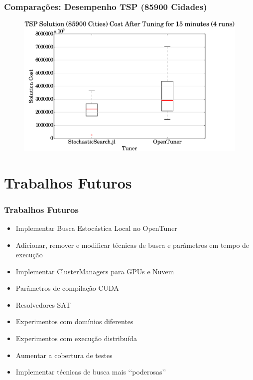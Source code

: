 \documentclass[10pt, compress]{beamer}
\begin{document}
\begin{frame}[fragile]
    \frametitle{Comparações: Desempenho TSP (85900 Cidades)}
    \begin{figure}[H]
        \centering
        \includegraphics[width=1\textwidth]{pla85900_15min_comparison}
    \end{figure}%
\end{frame}

\section{Trabalhos Futuros}

\begin{frame}[fragile]
    \frametitle{Trabalhos Futuros}
    \begin{itemize}
        \item Implementar Busca Estocástica Local no \alert{OpenTuner}
            \pause
        \item \alert{Adicionar}, \alert{remover} e \alert{modificar} técnicas
            de busca e parâmetros em \alert{tempo de execução}
            \pause
        \item Implementar \alert{ClusterManagers} para \alert{GPUs} e \alert{Nuvem}
            \pause
        \item Parâmetros de compilação \alert{CUDA}
        \item Resolvedores \alert{SAT}
            \pause
        \item Experimentos com \alert{domínios diferentes}
        \item Experimentos com \alert{execução distribuída}
            \pause
        \item \alert{Aumentar} a cobertura de testes
            \pause
        \item Implementar técnicas de busca mais \lq{}\lq{}\alert{poderosas}\rq{}\rq{}
    \end{itemize}
\end{frame}
\end{document}
